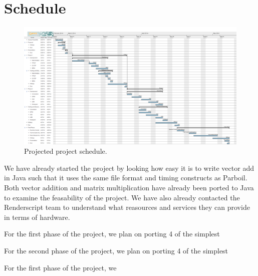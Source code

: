 
\section{Schedule}

\begin{figure}[h]
\includegraphics[scale=0.5, angle=90]{chart.png}
\caption{Projected project schedule.}
\centering
\end{figure}

We have already started the project by looking how
  easy it is to write vector add in Java such that
  it uses the same file format and timing constructs
  as Parboil.
Both vector addition and matrix multiplication have
  already been ported to Java to examine the feasability
  of the project.
We have also already contacted the Renderscript team
  to understand what reasources and services they can
  provide in terms of hardware.

For the first phase of the project, we plan on porting
  4 of the simplest 


For the second phase of the project, we plan on porting
  4 of the simplest 

For the first phase of the project, we 